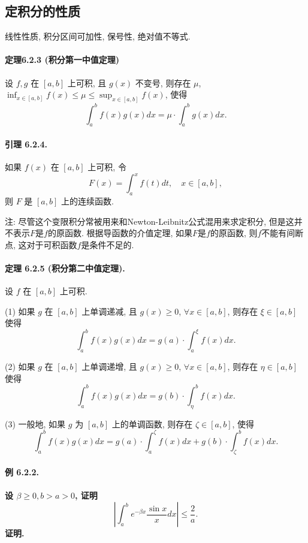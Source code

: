 \subsection{定积分的性质}

线性性质, 积分区间可加性, 保号性, 绝对值不等式.

\paragraph{定理6.2.3 (积分第一中值定理)}

设 $f,g$ 在 $[a,b]$ 上可积, 且 $g(x)$ 不变号, 则存在 $\mu$, $\inf_{x\in[a,b]}f(x)\leqslant\mu\leqslant\sup_{x\in[a,b]}f(x)$,
使得 
\[
\int_{a}^{b}f(x)g(x)dx=\mu\cdot\int_{a}^{b}g(x)dx.
\]


\paragraph{引理 6.2.4. }

如果 $f(x)$ 在 $[a,b]$ 上可积, 令 
\[
F(x)=\int_{a}^{x}f(t)dt,\quad x\in[a,b],
\]
则 $F$ 是 $[a,b]$ 上的连续函数.

注: 尽管这个变限积分常被用来和Newton-Leibnitz公式混用来求定积分, 但是这并不表示$F$是$f$的原函数. 根据导函数的介值定理,
如果$F$是$f$的原函数, 则$f$不能有间断点, 这对于可积函数$f$是条件不足的.

\paragraph{定理 6.2.5 (积分第二中值定理). }

设 $f$ 在 $[a,b]$ 上可积. 

(1) 如果 $g$ 在 $[a,b]$ 上单调递减, 且 $g(x)\geqslant0$, $\forall x\in[a,b]$,
则存在 $\xi\in[a,b]$ 使得 
\[
\int_{a}^{b}f(x)g(x)dx=g(a)\cdot\int_{a}^{\xi}f(x)dx.
\]

(2) 如果 $g$ 在 $[a,b]$ 上单调递增, 且 $g(x)\geqslant0$, $\forall x\in[a,b]$,
则存在 $\eta\in[a,b]$ 使得 
\[
\int_{a}^{b}f(x)g(x)dx=g(b)\cdot\int_{\eta}^{b}f(x)dx.
\]

(3) 一般地, 如果 $g$ 为 $[a,b]$ 上的单调函数, 则存在 $\zeta\in[a,b]$, 使得 
\[
\int_{a}^{b}f(x)g(x)dx=g(a)\cdot\int_{a}^{\zeta}f(x)dx+g(b)\cdot\int_{\zeta}^{b}f(x)dx.
\]


\paragraph{例 6.2.2. }

\paragraph{设 $\beta\geqslant0,b>a>0$, 证明 
\[
\left|\int_{a}^{b}e^{-\beta x}\frac{\sin x}{x}dx\right|\leqslant\frac{2}{a}.
\]
证明. }

